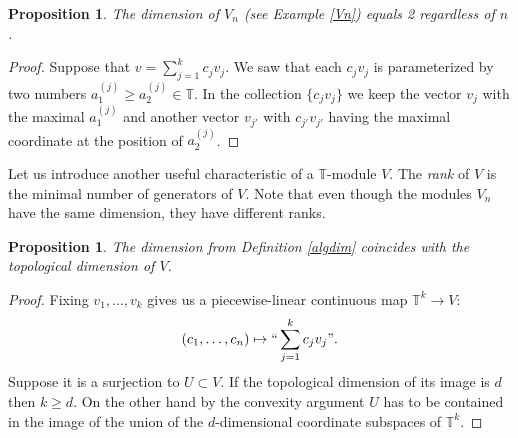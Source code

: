 \documentclass[12pt]{amsart}
\theoremstyle{plain}
\newtheorem{proposition}[theorem]{Proposition}
\theoremstyle{definition}
\theoremstyle{remark}
\newcommand{\T}{\mathbb T}    %
\newcommand{\<}{\langle}   %
\renewcommand{\>}{\rangle} %
\newcommand{\ignore}[1]{\relax}
\begin{document}
\begin{proposition}
The dimension of $V_n$ (see Example \ref{Vn}) equals 2 regardless of $n$.
\end{proposition}
\begin{proof}
Suppose that $v=\sum_{j=1}^k c_jv_j.$
We saw that each $c_jv_j$ is parameterized by two numbers $a^{(j)}_1\ge a^{(j)}_2\in\T$.
In the collection $\{c_jv_j\}$ we keep the vector $v_j$ with the maximal $a^{(j)}_1$
and another vector $v_{j'}$ with $c_{j'} v_{j'}$ having the maximal coordinate at the position of $a^{(j)}_2$.
\ignore{
Elements of $V_n$ are such $n$-tuples $v=(c_1,\dots,c_n)$ that
for some $j=1,\dots,n$
we have $c_k\ge c_j$ and $c_k=c_l$ as long as $k\neq j\neq l$.
Thus, once such $j$ is fixed we may parameterize such an element
with two parameters $t=\min\limits_{l=1,\dots,n}\{c_l\}$
and $s=\max\limits_{l=1,\dots,n}\{c_l\}$. We say that $v$ sits
on the $j$th ray at the distance $(s-t)$ from the center.

Note that if $v\in V_n$ belongs to
the $j$th ray and $v'\in V_n$ belongs to the $j'$th ray with $j\neq j'$
then $``cv+c'v'"$ for different $c,c'\in\T$ runs over
all elements sitting on the $j$th ray and distanced from the
center not greater than $v$ and all elements sitting on
the $j'$th ray and distanced from the
center not greater than $v'$.
Similarly, if $v$ and $v'$ belong to the same $j$th ray then
$``cv+c'v'"$ runs over all elements from the same ray whose
distance from the center is between that of $v$ and $v'$.
Thus if a linear combination $v=``\sum_{j=1}^k c_jv_j"$
belongs to the $j$th ray then we may re-represent it as a
tropical linear combination of only two elements from $v_1,\dots,v_k$.
}
\end{proof}
Let us introduce another useful characteristic of a $\T$-module $V$.
The {\em rank} of $V$ is the minimal number of generators of $V$.
Note that even though the modules $V_n$ have the same dimension,
they have different ranks.

\begin{proposition}
The dimension from Definition \ref{algdim} coincides with the
topological dimension of $V$.
\end{proposition}
\begin{proof}
Fixing $v_1,\dots,v_k$ gives us a piecewise-linear continuous map
$\T^k\to V$:
$$(c_1,\dots,c_n)\mapsto``\sum_{j=1}^k c_j v_j".$$
Suppose it is a surjection to $U\subset V$.
If the topological dimension of its image is $d$ then $k\ge d$.
On the other hand by the convexity argument $U$ has to be contained
in the image of the union of the $d$-dimensional coordinate subspaces
of $\T^k$.
\end{proof}
\end{document}
